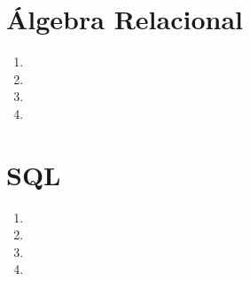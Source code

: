 \documentclass{article}
\begin{document}
	\pagebreak

	\section*{Álgebra Relacional}

	\begin{enumerate}[label=(\arabic*)]
		\item{}
		\item{}
		\item{}
		\item{}
	\end{enumerate}

	\vspace{5mm}

	\section*{SQL}

	\begin{enumerate}[label=(\arabic*)]
		\item{}
		\item{}
		\item{}
		\item{}
	\end{enumerate}
\end{document}

